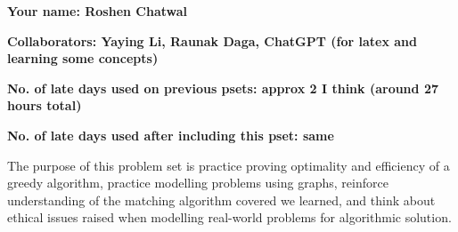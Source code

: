 \documentclass[11pt]{article}
\begin{document}

\textbf{Your name: Roshen Chatwal}

\textbf{Collaborators: Yaying Li, Raunak Daga, ChatGPT (for latex and learning some concepts)}

\textbf{No. of late days used on previous psets: approx 2 I think (around 27 hours total)}

\textbf{No. of late days used after including this pset: same }

The purpose of this problem set is practice proving optimality and efficiency of a greedy algorithm, practice modelling problems using graphs, reinforce understanding of the matching algorithm covered we learned, and think about ethical issues raised when modelling real-world problems for algorithmic solution.
\end{document}
